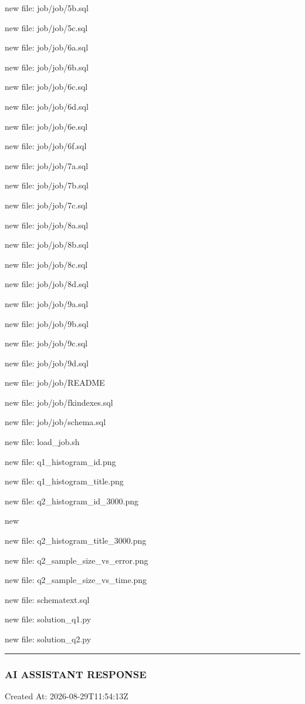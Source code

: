 \documentclass[11pt,a4paper]{article}
\begin{document}
{new file:   job/job/5b.sql

new file:   job/job/5c.sql

new file:   job/job/6a.sql

new file:   job/job/6b.sql

new file:   job/job/6c.sql

new file:   job/job/6d.sql

new file:   job/job/6e.sql

new file:   job/job/6f.sql

new file:   job/job/7a.sql

new file:   job/job/7b.sql

new file:   job/job/7c.sql

new file:   job/job/8a.sql

new file:   job/job/8b.sql

new file:   job/job/8c.sql

new file:   job/job/8d.sql

new file:   job/job/9a.sql

new file:   job/job/9b.sql

new file:   job/job/9c.sql

new file:   job/job/9d.sql

new file:   job/job/README

new file:   job/job/fkindexes.sql

new file:   job/job/schema.sql

new file:   load\_job.sh

new file:   q1\_histogram\_id.png

new file:   q1\_histogram\_title.png

new file:   q2\_histogram\_id\_3000.png

new

new file:   q2\_histogram\_title\_3000.png

new file:   q2\_sample\_size\_vs\_error.png

new file:   q2\_sample\_size\_vs\_time.png

new file:   schematext.sql

new file:   solution\_q1.py

new file:   solution\_q2.py


\hrule

\subsubsection{AI ASSISTANT RESPONSE}

Created At: 2026-08-29T11:54:13Z

}
\end{document}
